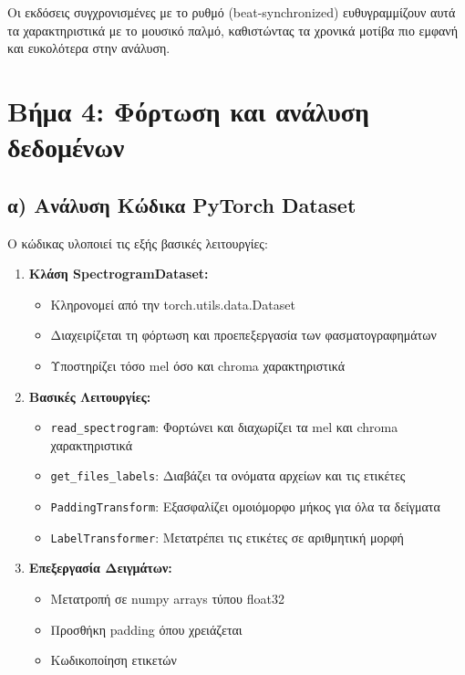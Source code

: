 \documentclass[a4paper,12pt]{article}
\begin{document}
Οι εκδόσεις συγχρονισμένες με το ρυθμό (beat-synchronized) ευθυγραμμίζουν αυτά τα χαρακτηριστικά με το μουσικό παλμό, καθιστώντας τα χρονικά μοτίβα πιο εμφανή και ευκολότερα στην ανάλυση.


\section*{Βήμα 4: Φόρτωση και ανάλυση δεδομένων}

\subsection*{α) Ανάλυση Κώδικα PyTorch Dataset}

Ο κώδικας υλοποιεί τις εξής βασικές λειτουργίες:

\begin{enumerate}
   \item \textbf{Κλάση SpectrogramDataset:}
   \begin{itemize}
       \item Κληρονομεί από την torch.utils.data.Dataset
       \item Διαχειρίζεται τη φόρτωση και προεπεξεργασία των φασματογραφημάτων
       \item Υποστηρίζει τόσο mel όσο και chroma χαρακτηριστικά
   \end{itemize}

   \item \textbf{Βασικές Λειτουργίες:}
   \begin{itemize}
       \item \texttt{read\_spectrogram}: Φορτώνει και διαχωρίζει τα mel και chroma χαρακτηριστικά
       \item \texttt{get\_files\_labels}: Διαβάζει τα ονόματα αρχείων και τις ετικέτες
       \item \texttt{PaddingTransform}: Εξασφαλίζει ομοιόμορφο μήκος για όλα τα δείγματα
       \item \texttt{LabelTransformer}: Μετατρέπει τις ετικέτες σε αριθμητική μορφή
   \end{itemize}

   \item \textbf{Επεξεργασία Δειγμάτων:}
   \begin{itemize}
       \item Μετατροπή σε numpy arrays τύπου float32
       \item Προσθήκη padding όπου χρειάζεται
       \item Κωδικοποίηση ετικετών
   \end{itemize}
\end{enumerate}
\end{document}
